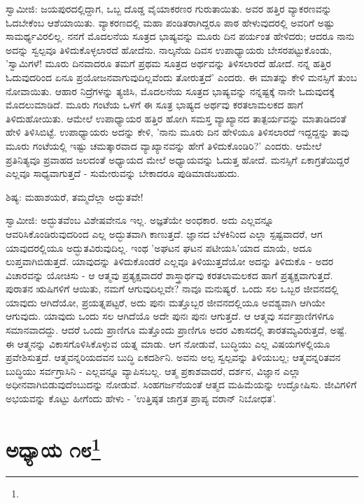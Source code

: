 ಸ್ವಾಮೀಜಿ: ಜಯಪುರದಲ್ಲಿದ್ದಾಗ, ಒಬ್ಬ ದೊಡ್ಡ ವೈಯಾಕರಣರ ಗುರುತಾಯಿತು. ಅವರ ಹತ್ತಿರ ವ್ಯಾಕರಣವನ್ನು ಓದಬೇಕೆಂಬ ಆಶೆಯಾಯಿತು. ವ್ಯಾಕರಣದಲ್ಲಿ ಮಹಾ ಪಂಡಿತರಾಗಿದ್ದರೂ ಪಾಠ ಹೇಳುವುದರಲ್ಲಿ ಅವರಿಗೆ ಅಷ್ಟು ಸಾಮರ್ಥ್ಯವಿರಲಿಲ್ಲ. ನನಗೆ ಮೊದಲನೆಯ ಸೂತ್ರದ ಭಾಷ್ಯವನ್ನು ಮೂರು ದಿನ ಪರ್ಯಂತ ಹೇಳಿದರು; ಆದರೂ ನಾನು ಅದನ್ನು ಸ್ವಲ್ಪವೂ ತಿಳಿದುಕೊಳ್ಳಲಾರದೆ ಹೋದೆನು. ನಾಲ್ಕನೆಯ ದಿವಸ ಉಪಾಧ್ಯಾಯರು ಬೇಸರಪಟ್ಟುಕೊಂಡು, 'ಸ್ವಾಮಿಗಳೆ! ಮೂರು ದಿನವಾದರೂ ತಮಗೆ ಪ್ರಥಮ ಸೂತ್ರದ ಅರ್ಥವನ್ನು ತಿಳಿಸಲಾರದೆ ಹೋದೆ. ನನ್ನ ಹತ್ತಿರ ಓದುವುದರಿಂದ ಏನೂ ಪ್ರಯೋಜನವಾಗುವುದಿಲ್ಲವೆಂದು ತೋರುತ್ತದೆ' ಎಂದರು. ಈ ಮಾತನ್ನು ಕೇಳಿ ಮನಸ್ಸಿಗೆ ತುಂಬ ನೋವಾಯಿತು. ಆಹಾರ ನಿದ್ರೆಗಳನ್ನು ತ್ಯಜಿಸಿ, ಮೊದಲನೆಯ ಸೂತ್ರದ ಭಾಷ್ಯವನ್ನು ನನ್ನಷ್ಟಕ್ಕೆ ನಾನೇ ಓದುವುದಕ್ಕೆ ಮೊದಲುಮಾಡಿದೆ. ಮೂರು ಗಂಟೆಯ ಒಳಗೆ ಈ ಸೂತ್ರ ಭಾಷ್ಯದ ಅರ್ಥವು ಕರತಲಾಮಲಕದ ಹಾಗೆ ತಿಳಿದುಹೋಯಿತು. ಆಮೇಲೆ ಉಪಾಧ್ಯಾಯರ ಹತ್ತಿರ ಹೋಗಿ ಸಮಸ್ತ ವ್ಯಾಖ್ಯಾನದ ತಾತ್ಪರ್ಯವನ್ನು ಮಾತಾಡಿದಂತೆ ಹೇಳಿ ತಿಳಿಸಿಬಿಟ್ಟೆ. ಉಪಾಧ್ಯಾಯರು ಅದನ್ನು ಕೇಳಿ, 'ನಾನು ಮೂರು ದಿನ ಹೇಳಿಯೂ ತಿಳಿಸಲಾರದೆ ಇದ್ದದ್ದನ್ನು ತಾವು ಮೂರು ಗಂಟೆಯಲ್ಲಿ ಇಷ್ಟು ಚಮತ್ಕಾರವಾದ ವ್ಯಾಖ್ಯಾನವನ್ನು ಹೇಗೆ ತಿಳಿದುಕೊಂಡಿರಿ?' ಎಂದರು. ಆಮೇಲೆ ಪ್ರತಿನಿತ್ಯವೂ ಪ್ರವಾಹದ ಜಲದಂತೆ ಅಧ್ಯಾಯದ ಮೇಲೆ ಅಧ್ಯಾಯವನ್ನು ಓದುತ್ತ ಹೋದೆ. ಮನಸ್ಸಿಗೆ ಏಕಾಗ್ರತೆಯಿದ್ದರೆ ಎಲ್ಲವೂ ಸಾಧ್ಯವಾಗುತ್ತದೆ - ಸುಮೇರುವನ್ನು ಬೇಕಾದರೂ ಪುಡಿಮಾಡಬಹುದು.

ಶಿಷ್ಯ: ಮಹಾಶಯರೆ, ತಮ್ಮದೆಲ್ಲಾ ಅದ್ಭುತವೇ!

ಸ್ವಾಮೀಜಿ: ಅದ್ಭುತವೆಂಬ ವಿಶೇಷವೇನೂ ಇಲ್ಲ. ಅಜ್ಞತೆಯೇ ಅಂಧಕಾರ. ಅದು ಎಲ್ಲವನ್ನೂ ಆವರಿಸಿಕೊಂಡಿರುವುದರಿಂದ ಎಲ್ಲ ಅದ್ಭುತವಾಗಿ ಕಾಣುತ್ತದೆ. ಜ್ಞಾನದ ಬೆಳಕಿನಿಂದ ಎಲ್ಲಾ ಸ್ಪಷ್ಟವಾದರೆ, ಆಗ ಯಾವುದರಲ್ಲಿಯೂ ಅದ್ಭುತವಿರುವುದಿಲ್ಲ. ಇಂಥ 'ಅಘಟನ ಘಟನ ಪಟೀಯಸಿ'ಯಾದ ಮಾಯೆ, ಅದೂ ಲುಪ್ತವಾಗಿಬಿಡುತ್ತದೆ. ಯಾವುದನ್ನು ತಿಳಿದುಕೊಂಡರೆ ಎಲ್ಲವೂ ತಿಳಿಯುತ್ತದೆಯೋ ಅದನ್ನು ತಿಳಿದುಕೊ - ಅದರ ವಿಚಾರವನ್ನು ಯೋಚಿಸು - ಆ ಆತ್ಮವು ಪ್ರತ್ಯಕ್ಷವಾದರೆ ಶಾಸ್ತ್ರಾರ್ಥವು ಕರತಲಾಮಲಕದ ಹಾಗೆ ಪ್ರತ್ಯಕ್ಷವಾಗುತ್ತದೆ. ಪುರಾತನ ಋಷಿಗಳಿಗೆ ಆಯಿತು, ನಮಗೆ ಆಗುವುದಿಲ್ಲವೇ? ನಾವೂ ಮನುಷ್ಯರೆ. ಒಂದು ಸಲ ಒಬ್ಬರ ಜೀವನದಲ್ಲಿ ಯಾವುದು ಆಗಿದೆಯೋ, ಪ್ರಯತ್ನಪಟ್ಟರೆ, ಅದು ಪುನಃ ಮತ್ತೊಬ್ಬರ ಜೀವನದಲ್ಲಿಯೂ ಅವಶ್ಯವಾಗಿ ಆಗಿಯೇ ಆಗುವುದು. ಯಾವುದು ಒಂದು ಸಲ ಆಗಿದೆಯೊ ಅದೇ ಪುನಃ ಪುನಃ ಆಗುತ್ತದೆ. ಆ ಆತ್ಮವು ಸರ್ವಪ್ರಾಣಿಗಳಿಗೂ ಸಮಾನವಾದದ್ದು. ಆದರೆ ಒಂದು ಪ್ರಾಣಿಗೂ ಮತ್ತೊಂದು ಪ್ರಾಣಿಗೂ ಅದರ ವಿಕಾಸದಲ್ಲಿ ತಾರತಮ್ಯವಿರುತ್ತದೆ, ಅಷ್ಟೆ. ಈ ಆತ್ಮನನ್ನು ವಿಕಾಸಗೊಳಿಸಿಕೊಳ್ಳುವ ಯತ್ನ ಮಾಡು. ಆಗ ನೋಡುವೆ, ಬುದ್ಧಿಯು ಎಲ್ಲ ವಿಷಯಗಳಲ್ಲಿಯೂ ಪ್ರವೇಶಿಸುತ್ತದೆ. ಆತ್ಮವನ್ನರಿಯದವನ ಬುದ್ಧಿ ಏಕದರ್ಶಿನಿ. ಅವನು ಅಲ್ಪ ಸ್ವಲ್ಪವನ್ನು ತಿಳಿಯಬಲ್ಲ; ಆತ್ಮವನ್ನರಿತವನ ಬುದ್ಧಿಯು ಸರ್ವಗ್ರಾಸಿನಿ - ಎಲ್ಲವನ್ನೂ ವ್ಯಾಪಿಸಬಲ್ಲ. ಆತ್ಮ ಪ್ರಕಾಶವಾದರೆ, ದರ್ಶನ, ವಿಜ್ಞಾನ ಎಲ್ಲಾ ಅಧೀನವಾಗಿಬಿಡುವುದೆಂಬುದನ್ನು ನೋಡುವೆ. ಸಿಂಹಗರ್ಜನೆಯಂತೆ ಆತ್ಮದ ಮಹಿಮೆಯನ್ನು ಉದ್ಘೋಷಿಸು. ಜೀವಿಗಳಿಗೆ ಅಭಯವನ್ನು ಕೊಟ್ಟು ಹೀಗೆಂದು ಹೇಳು - 'ಉತ್ತಿಷ್ಠತ ಜಾಗ್ರತ ಪ್ರಾಪ್ಯ ವರಾನ್ ನಿಬೋಧತ'.

\newpage

\chapter[ಅಧ್ಯಾಯ ೧೮]{ಅಧ್ಯಾಯ ೧೮\protect\footnote{}}

